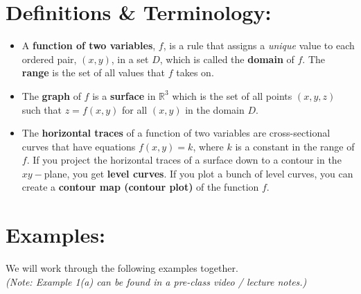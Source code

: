 \section*{Definitions \& Terminology:}

\begin{itemize}

\item A \textbf{function of two variables}, \(f\), is a rule that assigns a \textit{unique} value to each ordered pair, \((x,y)\), in a set \(D\), which is called the \textbf{domain} of \(f\). The \textbf{range} is the set of all values that \(f\) takes on.

\item The \textbf{graph} of \(f\) is a \textbf{surface} in \(\mathbb{R}^3\) which is the set of all points \((x,y,z)\) such that \(z=f(x,y)\) for all \((x,y)\) in the domain \(D\).

\item The \textbf{horizontal traces} of a function of two variables are cross-sectional curves that have equations \(f(x,y)=k\), where \(k\) is a constant in the range of \(f\). If you project the horizontal traces of a surface down to a contour in the \(xy-\)plane, you get \textbf{level curves}. If you plot a bunch of level curves, you can create a \textbf{contour map (contour plot)} of the function \(f\).

\end{itemize}



\section*{Examples:}
We will work through the following examples together.\\
 \textit{(Note: Example 1(a) can be found in a pre-class video / lecture notes.)}

